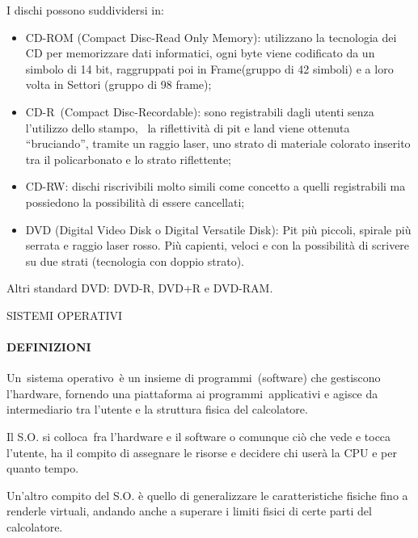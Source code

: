 \documentclass[
]{article}
\providecommand{\tightlist}{%
  \setlength{\itemsep}{0pt}\setlength{\parskip}{0pt}}
\begin{document}
{}

{I dischi possono suddividersi in:}

{}

\begin{itemize}
\tightlist
\item
  {CD-ROM }{(Compact Disc-Read Only Memory): utilizzano la tecnologia
  dei CD per memorizzare dati informatici, ogni byte viene }{codificato
  da un simbolo di 14 bit}{, raggruppati poi in }{Frame}{(gruppo di 42
  simboli) e a loro volta in Settori (gruppo di 98 frame);}
\item
  {CD-R}{~(Compact Disc-Recordable): sono registrabili dagli utenti
  senza l'utilizzo dello stampo, ~la riflettività di pit e land viene
  ottenuta ``bruciando'', tramite un raggio laser, uno strato di
  materiale colorato inserito tra il policarbonato e lo strato
  riflettente;}
\item
  {CD-RW}{: dischi riscrivibili molto simili come concetto a quelli
  registrabili ma possiedono la possibilità di essere cancellati;}
\item
  {DVD }{(Digital Video Disk o Digital Versatile Disk): Pit più piccoli,
  spirale più serrata e raggio laser rosso. Più capienti, veloci e con
  la possibilità di scrivere su due strati (tecnologia con doppio
  strato).}
\end{itemize}

{Altri standard DVD: DVD-R, DVD+R e DVD-RAM.}

{}

{}

{SISTEMI OPERATIVI}

\paragraph{\texorpdfstring{{DEFINIZIONI}}{DEFINIZIONI}}\label{h.mzj0febxrs32}

{Un}{~sistema operativo}{~è un }{insieme di programmi}{~(software) che
}{gestiscono l'hardware}{, fornendo una }{piattaforma ai
programmi}{~applicativi e agisce da intermediario tra l'utente e la
struttura fisica del calcolatore.}

{Il S.O. }{si colloca}{~fra l'hardware e il software o comunque ciò che
vede e tocca l'utente, ha il compito di assegnare le risorse e decidere
chi userà la CPU e per quanto tempo.}

{Un'altro compito del S.O. è quello di generalizzare le caratteristiche
fisiche fino a renderle virtuali, andando anche a superare i limiti
fisici di certe parti del calcolatore.}
\end{document}
